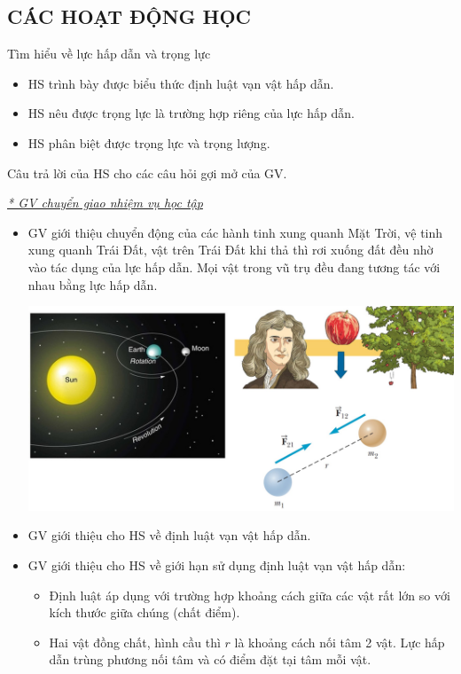 \subsection{CÁC HOẠT ĐỘNG HỌC}
\hoatdong
{Tìm hiểu về lực hấp dẫn và trọng lực
}
{\begin{itemize}
		\item HS trình bày được biểu thức định luật vạn vật hấp dẫn.
		\item HS nêu được trọng lực là trường hợp riêng của lực hấp dẫn.
		\item HS phân biệt được trọng lực và trọng lượng.
	\end{itemize}
}
{Câu trả lời của HS cho các câu hỏi gợi mở của GV.
}
{\textit{\underline{* GV chuyển giao nhiệm vụ học tập}}
	\begin{itemize}[label=-]
		\item GV giới thiệu chuyển động của các hành tinh xung quanh Mặt Trời, vệ tinh xung quanh Trái Đất, vật trên Trái Đất khi thả thì rơi xuống đất đều nhờ vào tác dụng của lực hấp dẫn. Mọi vật trong vũ trụ đều đang tương tác với nhau bằng lực hấp dẫn.
		\begin{center}
			\includegraphics[scale=0.4]{figs/G10-BAI11-1}
		\end{center}
		\item GV giới thiệu cho HS về định luật vạn vật hấp dẫn.
		\item GV giới thiệu cho HS về giới hạn sử dụng định luật vạn vật hấp dẫn:
		\begin{itemize}[label=$\bullet$]
			\item Định luật áp dụng với trường hợp khoảng cách giữa các vật rất lớn so với kích thước giữa chúng (chất điểm).
			\item Hai vật đồng chất, hình cầu thì $r$ là khoảng cách nối tâm 2 vật. Lực hấp dẫn trùng phương nối tâm và có điểm đặt tại tâm mỗi vật.

\end{itemize}
\end{itemize}}
